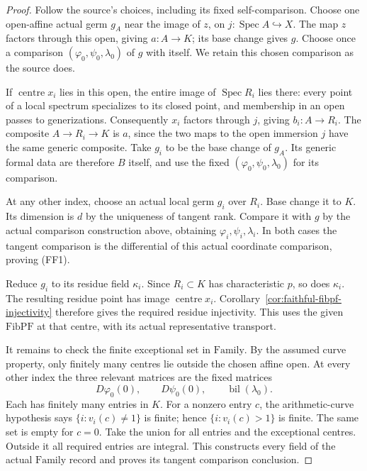 \begin{proof}
Follow the source's choices, including its fixed
self-comparison.
Choose one open-affine actual germ \(g_A\) near the
image of \(z\), on \(j:\operatorname{Spec}A\hookrightarrow X\).
The map \(z\) factors through this open, giving
\(a:A\to K\); its base change gives \(g\).
Choose once a comparison
\((\varphi_0,\psi_0,\lambda_0)\) of \(g\) with itself.
We retain this chosen comparison as the source does.

If \(\operatorname{centre}x_i\) lies in this open,
the entire image of \(\operatorname{Spec}R_i\) lies there:
every point of a local spectrum specializes to its
closed point, and membership in an open passes to
generizations.
Consequently \(x_i\) factors through \(j\), giving
\(b_i:A\to R_i\).
The composite \(A\to R_i\to K\) is \(a\), since the
two maps to the open immersion \(j\) have the same
generic composite.
Take \(g_i\) to be the base change of \(g_A\).
Its generic formal data are therefore \(B\) itself,
and use the fixed
\((\varphi_0,\psi_0,\lambda_0)\) for its comparison.

At any other index, choose an actual local germ \(g_i\)
over \(R_i\).
Base change it to \(K\).
Its dimension is \(d\) by the uniqueness of tangent rank.
Compare it with \(g\) by the actual comparison construction
above, obtaining \(\varphi_i,\psi_i,\lambda_i\).
In both cases the tangent comparison is the differential
of this actual coordinate comparison, proving (FF1).

Reduce \(g_i\) to its residue field \(\kappa_i\).
Since \(R_i\subset K\) has characteristic \(p\), so does
\(\kappa_i\).
The resulting residue point has image
\(\operatorname{centre}x_i\).
Corollary~\ref{cor:faithful-fibpf-injectivity} therefore
gives the required residue injectivity.
This uses the given \(\mathrm{FibPF}\) at that centre,
with its actual representative transport.

It remains to check the finite exceptional set in
\(\mathrm{Family}\).
By the assumed curve property, only finitely many
centres lie outside the chosen affine open.
At every other index the three relevant matrices
are the fixed matrices
\[
 D\varphi_0(0),\qquad D\psi_0(0),\qquad
                         \operatorname{bil}(\lambda_0).
\]
Each has finitely many entries in \(K\).
For a nonzero entry \(c\), the arithmetic-curve
hypothesis says \(\{i:v_i(c)\ne1\}\) is finite;
hence \(\{i:v_i(c)>1\}\) is finite.
The same set is empty for \(c=0\).
Take the union for all entries and the exceptional
centres.
Outside it all required entries are integral.
This constructs every field of the actual
\(\mathrm{Family}\) record and proves its tangent
comparison conclusion.
\end{proof}

